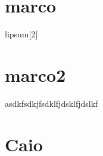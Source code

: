 
    \section{marco}
    lipsum[2]

    \section{marco2}
    asdkfsdkjfsdklfjdsklfjdslkf
    
    \section{Caio}
    

